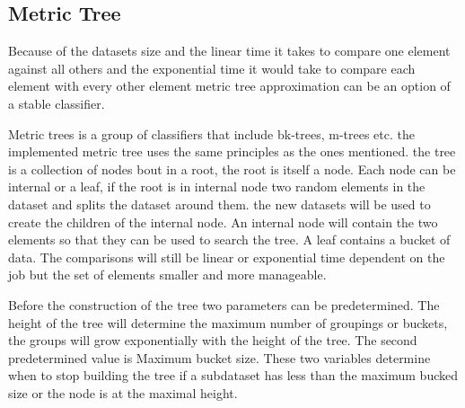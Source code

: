 \subsection{Metric Tree}
Because of the datasets size and the linear time it takes to compare one element against all others and the exponential time it would take to compare each element with every other element metric tree approximation can be an option of a stable classifier. 

Metric trees is a group of classifiers that include bk-trees, m-trees etc. the implemented metric tree uses the same principles as the ones mentioned. the tree is a collection of nodes bout in a root, the root is itself a node. Each node can be internal or a leaf, if the root is in internal node two random elements in the dataset and splits the dataset around them. the new datasets will be used to create the children of the internal node. An internal node will contain the two elements so that they can be used to search the tree. A leaf contains a bucket of data. The comparisons will still be linear or exponential time dependent on the job but the set of elements smaller and more manageable.

Before the construction of the tree two parameters can be predetermined. The height of the tree will determine the maximum number of  groupings or buckets, the groups will grow exponentially with the height of the tree. The second predetermined value is Maximum bucket size. These two variables determine when to stop building the tree if a subdataset has less than the maximum bucked size or the node is at the maximal height.
